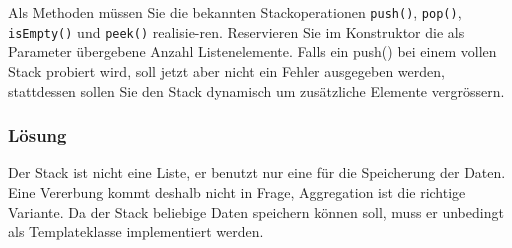 Als Methoden müssen Sie die bekannten Stackoperationen \texttt{push()}, \texttt{pop()}, \texttt{isEmpty()} und \texttt{peek()} realisie-ren. Reservieren Sie im Konstruktor die als Parameter übergebene Anzahl Listenelemente. Falls ein push() bei einem vollen Stack probiert wird, soll jetzt aber nicht ein Fehler ausgegeben werden, stattdessen sollen Sie den Stack dynamisch um zusätzliche Elemente vergrössern.

\subsubsection{Lösung}
Der Stack ist nicht eine Liste, er benutzt nur eine für die Speicherung der Daten. Eine Vererbung kommt deshalb nicht in Frage, Aggregation ist die richtige Variante. Da der Stack beliebige Daten speichern können soll, muss er unbedingt als Templateklasse implementiert werden.


\noindent\makebox[\linewidth]{\rule{\paperwidth}{0.4pt}}

\noindent\makebox[\linewidth]{\rule{\paperwidth}{0.4pt}}

\noindent\makebox[\linewidth]{\rule{\paperwidth}{0.4pt}}


